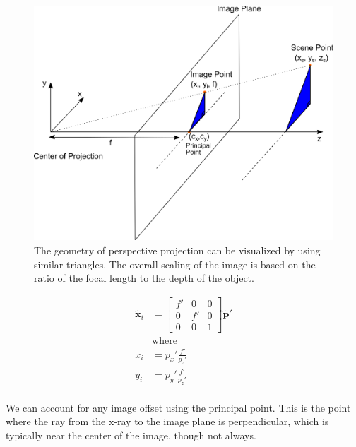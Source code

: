 \begin{figure}[h!]
    \begin{center}
        \includegraphics[width=0.85\linewidth]{figs/background/png/perspective-projection.png}
    \end{center}
    \caption{The geometry of perspective projection can be visualized by using similar triangles. The overall scaling of the image is based on the ratio of the focal length to the depth of the object.}
    \label{fig:perspective-projection}
\end{figure}


\begin{equation}
    \begin{aligned}
        \tilde{\mathbf{x}}_{i} &= \begin{bmatrix}
            f' & 0 & 0 \\ 0 & f' & 0 \\ 0 & 0 & 1 
        \end{bmatrix} \tilde{\mathbf{p}}' \\
        &\text{where} \\
        x_i &= p_x'\frac{f'}{p_z'} \\
        y_i &= p_y'\frac{f'}{p_z'} \\
    \end{aligned}
    \label{eq:perspective-projection}
\end{equation}

We can account for any image offset using the principal point. This is the point where the ray from the x-ray to the image plane is perpendicular, which is typically near the center of the image, though not always.

